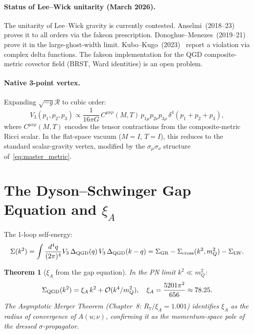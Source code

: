 \documentclass[11pt,a4paper]{article}
\theoremstyle{plain}
\newtheorem{theorem}{Theorem}[section]
\theoremstyle{definition}
\theoremstyle{remark}
\newcommand{\mQ}{m_Q}
\newcommand{\xiA}{\xi_A}
\begin{document}
\paragraph{Status of Lee--Wick unitarity (March 2026).}
The unitarity of Lee--Wick gravity is currently contested.
Anselmi~(2018--23) proves it to all orders via the fakeon prescription.
Donoghue--Menezes~(2019--21) prove it in the large-ghost-width limit.
Kubo--Kugo~(2023)~\cite{Kubo2023} report a violation via complex delta
functions.  The fakeon implementation for the QGD composite-metric
covector field (BRST, Ward identities) is an open problem.

\paragraph{Native 3-point vertex.}
Expanding $\sqrt{-g}\mathcal{R}$ to cubic order:
\begin{equation}
  V_3(p_1,p_2,p_3)
  \propto \frac{1}{16\pi G}\,
    C^{\mu\nu\rho}(M,T)\,p_{1\mu}p_{2\nu}p_{3\rho}\,
    \delta^4(p_1+p_2+p_3),
  \label{eq:V3}
\end{equation}
where $C^{\mu\nu\rho}(M,T)$ encodes the tensor contractions from the
composite-metric Ricci scalar.  In the flat-space vacuum ($M=I$, $T=I$),
this reduces to the standard scalar-gravity vertex, modified by the
$\sigma_\mu\sigma_\nu$ structure of~\eqref{eq:master_metric}.

\section{The Dyson--Schwinger Gap Equation and $\xi_A$}
\label{sec:gap}

The 1-loop self-energy:
\begin{equation}
  \Sigma(k^2) = \int\frac{d^4q}{(2\pi)^4}V_3\,\Delta_{\rm QGD}(q)\,
    V_3\,\Delta_{\rm QGD}(k-q)
  = \Sigma_{\rm GR} - \Sigma_{\rm cross}(k^2,\mQ^2) - \Sigma_{\rm LW}.
  \label{eq:SE}
\end{equation}

\begin{theorem}[$\xiA$ from the gap equation]\label{thm:gap}
In the PN limit $k^2\ll\mQ^2$:
\begin{equation}
  \Sigma_{\rm QGD}(k^2) = \xiA\,k^2 + \mathcal{O}(k^4/\mQ^2),
  \quad \xiA = \frac{5201\pi^2}{656}\approx78.25.
  \label{eq:SE_expand}
\end{equation}
The Asymptotic Merger Theorem (Chapter~8: $R_7/\xiA=1.001$) identifies
$\xiA$ as the radius of convergence of $A(u;\nu)$, confirming it as the
momentum-space pole of the dressed $\sigma$-propagator.
\end{theorem}
\end{document}
